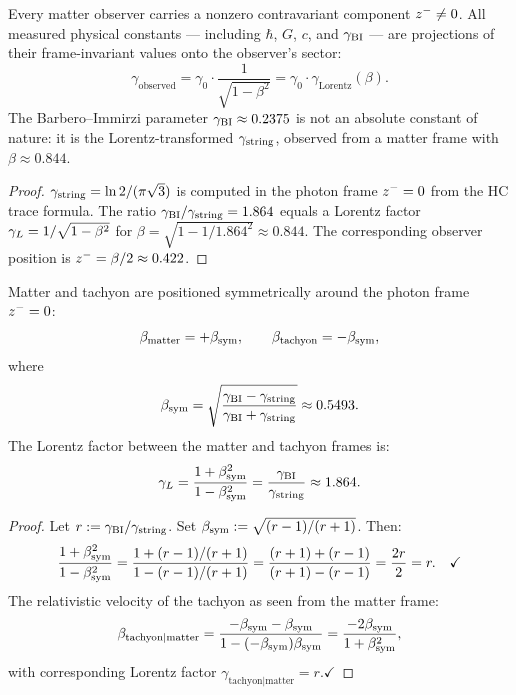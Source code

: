 \begin{theorem}\label{thm:frame-offset}
Every matter observer carries a nonzero contravariant component
$z^-\neq 0$.
All measured physical constants --- including $\hbar$, $G$, $c$, and
$\gamma_{\mathrm{BI}}$ --- are projections of their frame-invariant values onto the
observer's sector:
\[
  \gamma_{\mathrm{observed}}
  = \gamma_0\cdot\frac{1}{\sqrt{1-\beta^2}}
  = \gamma_0\cdot\gamma_{\mathrm{Lorentz}}(\beta).
\]
The Barbero--Immirzi parameter $\gamma_{\mathrm{BI}}\approx 0.2375$ is not an absolute
constant of nature: it is the Lorentz-transformed $\gamma_{\mathrm{string}}$, observed
from a matter frame with $\beta\approx 0.844$.
\end{theorem}

\begin{proof}
$\gamma_{\mathrm{string}} = \ln 2/(\pi\sqrt{3})$ is computed in the photon frame
$z^-=0$ from the HC trace formula.
The ratio $\gamma_{\mathrm{BI}}/\gamma_{\mathrm{string}} = 1.864$ equals a Lorentz factor
$\gamma_L = 1/\sqrt{1-\beta^2}$ for $\beta=\sqrt{1-1/1.864^2}\approx 0.844$.
The corresponding observer position is $z^-=\beta/2\approx 0.422$.
\end{proof}

\begin{theorem}\label{thm:symmetric-frame}
Matter and tachyon are positioned symmetrically around the photon frame
$z^-=0$:
\[
  \beta_{\mathrm{matter}} = +\beta_{\mathrm{sym}},\qquad
  \beta_{\mathrm{tachyon}} = -\beta_{\mathrm{sym}},
\]
where
\[
  \beta_{\mathrm{sym}} = \sqrt{\frac{\gamma_{\mathrm{BI}}-\gamma_{\mathrm{string}}}{\gamma_{\mathrm{BI}}+\gamma_{\mathrm{string}}}}\approx 0.5493.
\]
The Lorentz factor between the matter and tachyon frames is:
\[
  \gamma_L = \frac{1+\beta_{\mathrm{sym}}^2}{1-\beta_{\mathrm{sym}}^2}
      = \frac{\gamma_{\mathrm{BI}}}{\gamma_{\mathrm{string}}}\approx 1.864.
\]
\end{theorem}

\begin{proof}
Let $r:=\gamma_{\mathrm{BI}}/\gamma_{\mathrm{string}}$. Set $\beta_{\mathrm{sym}}:=\sqrt{(r-1)/(r+1)}$. Then:
\[
  \frac{1+\beta_{\mathrm{sym}}^2}{1-\beta_{\mathrm{sym}}^2}
  =\frac{1+(r-1)/(r+1)}{1-(r-1)/(r+1)}
  =\frac{(r+1)+(r-1)}{(r+1)-(r-1)}=\frac{2r}{2}=r.\quad\checkmark
\]
The relativistic velocity of the tachyon as seen from the matter frame:
\[
  \beta_{\mathrm{tachyon}|\mathrm{matter}}
  =\frac{-\beta_{\mathrm{sym}}-\beta_{\mathrm{sym}}}{1-(-\beta_{\mathrm{sym}})\beta_{\mathrm{sym}}}
  =\frac{-2\beta_{\mathrm{sym}}}{1+\beta_{\mathrm{sym}}^2},
\]
with corresponding Lorentz factor $\gamma_{\mathrm{tachyon}|\mathrm{matter}}=r$.\quad$\checkmark$
\end{proof}



